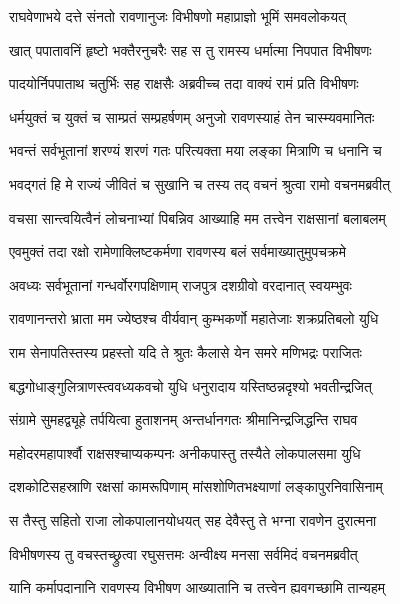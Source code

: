 
\twolineshloka
{राघवेणाभये दत्ते संनतो रावणानुजः}
{विभीषणो महाप्राज्ञो भूमिं समवलोकयत्} %

\twolineshloka
{खात् पपातावनिं हृष्टो भक्तैरनुचरैः सह}
{स तु रामस्य धर्मात्मा निपपात विभीषणः} %

\twolineshloka
{पादयोर्निपपाताथ चतुर्भिः सह राक्षसैः}
{अब्रवीच्च तदा वाक्यं रामं प्रति विभीषणः} %

\twolineshloka
{धर्मयुक्तं च युक्तं च साम्प्रतं सम्प्रहर्षणम्}
{अनुजो रावणस्याहं तेन चास्म्यवमानितः} %

\twolineshloka
{भवन्तं सर्वभूतानां शरण्यं शरणं गतः}
{परित्यक्ता मया लङ्का मित्राणि च धनानि च} %

\twolineshloka
{भवद्गतं हि मे राज्यं जीवितं च सुखानि च}
{तस्य तद् वचनं श्रुत्वा रामो वचनमब्रवीत्} %

\twolineshloka
{वचसा सान्त्वयित्वैनं लोचनाभ्यां पिबन्निव}
{आख्याहि मम तत्त्वेन राक्षसानां बलाबलम्} %

\twolineshloka
{एवमुक्तं तदा रक्षो रामेणाक्लिष्टकर्मणा}
{रावणस्य बलं सर्वमाख्यातुमुपचक्रमे} %

\twolineshloka
{अवध्यः सर्वभूतानां गन्धर्वोरगपक्षिणाम्}
{राजपुत्र दशग्रीवो वरदानात् स्वयम्भुवः} %

\twolineshloka
{रावणानन्तरो भ्राता मम ज्येष्ठश्च वीर्यवान्}
{कुम्भकर्णो महातेजाः शक्रप्रतिबलो युधि} %

\twolineshloka
{राम सेनापतिस्तस्य प्रहस्तो यदि ते श्रुतः}
{कैलासे येन समरे मणिभद्रः पराजितः} %

\twolineshloka
{बद्धगोधाङ्गुलित्राणस्त्ववध्यकवचो युधि}
{धनुरादाय यस्तिष्ठन्नदृश्यो भवतीन्द्रजित्} %

\twolineshloka
{संग्रामे सुमहद्व्यूहे तर्पयित्वा हुताशनम्}
{अन्तर्धानगतः श्रीमानिन्द्रजिद्धन्ति राघव} %

\twolineshloka
{महोदरमहापार्श्वौ राक्षसश्चाप्यकम्पनः}
{अनीकपास्तु तस्यैते लोकपालसमा युधि} %

\twolineshloka
{दशकोटिसहस्राणि रक्षसां कामरूपिणाम्}
{मांसशोणितभक्ष्याणां लङ्कापुरनिवासिनाम्} %

\twolineshloka
{स तैस्तु सहितो राजा लोकपालानयोधयत्}
{सह देवैस्तु ते भग्ना रावणेन दुरात्मना} %

\twolineshloka
{विभीषणस्य तु वचस्तच्छ्रुत्वा रघुसत्तमः}
{अन्वीक्ष्य मनसा सर्वमिदं वचनमब्रवीत्} %

\twolineshloka
{यानि कर्मापदानानि रावणस्य विभीषण}
{आख्यातानि च तत्त्वेन ह्यवगच्छामि तान्यहम्} %

